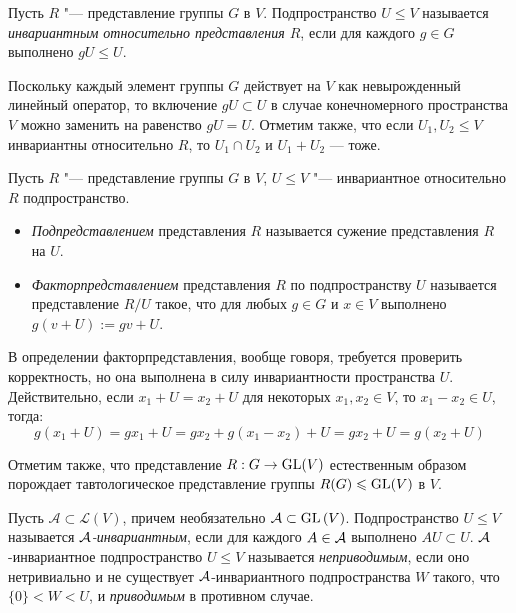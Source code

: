 \begin{definition}
	Пусть $R$ "--- представление группы $G$ в $V$. Подпространство $U \le V$ называется \textit{инвариантным относительно представления $R$}, если для каждого $g \in G$ выполнено $gU \le U$.
\end{definition}

\begin{note}
	Поскольку каждый элемент группы $G$ действует на $V$ как невырожденный линейный оператор, то включение $gU \subset U$ в случае конечномерного пространства $V$ можно заменить на равенство $gU = U$. Отметим также, что если $U_1, U_2 \le V$ инвариантны относительно $R$, то $U_1 \cap U_2$ и $U_1 + U_2$ --- тоже.
\end{note}

\begin{definition}
	Пусть $R$ "--- представление группы $G$ в $V$, $U \le V$ "--- инвариантное относительно $R$ подпространство.
	\begin{itemize}
		\item \textit{Подпредставлением} представления $R$ называется сужение представления $R$ на $U$.
		\item \textit{Факторпредставлением} представления $R$ по подпространству $U$ называется представление $R / U$ такое, что для любых $g \in G$ и $x \in V$ выполнено $g(v + U) := gv + U$.
	\end{itemize}
\end{definition}

\begin{note}
	В определении факторпредставления, вообще говоря, требуется проверить корректность, но она выполнена в силу инвариантности пространства $U$. Действительно, если $x_1 + U = x_2 + U$ для некоторых $x_1, x_2 \in V$, то $x_1 - x_2 \in U$, тогда:
	\[g(x_1 + U) = gx_1 + U = gx_2 + g(x_1 - x_2) + U = gx_2 + U = g(x_2 + U)\]
	
	Отметим также, что представление $R : G \to \operatorname{GL}(V)$ естественным образом порождает тавтологическое представление группы $R(G) \leqslant \operatorname{GL}(V)$ в $V$.
\end{note}

\begin{definition}
	Пусть $\mathcal A \subset \mathcal{L}(V)$, причем необязательно $\mathcal A \subset \operatorname{GL}{(V)}$. Подпространство $U \le V$ называется \textit{$\mathcal A$-инвариантным}, если для каждого $A \in \mathcal A$ выполнено $AU \subset U$. $\mathcal A$-инвариантное подпространство $U \le V$ называется \textit{неприводимым}, если оно нетривиально и не существует $\mathcal A$-инвариантного подпространства $W$ такого, что $\{0\} < W < U$, и \textit{приводимым} в противном случае.
\end{definition}

